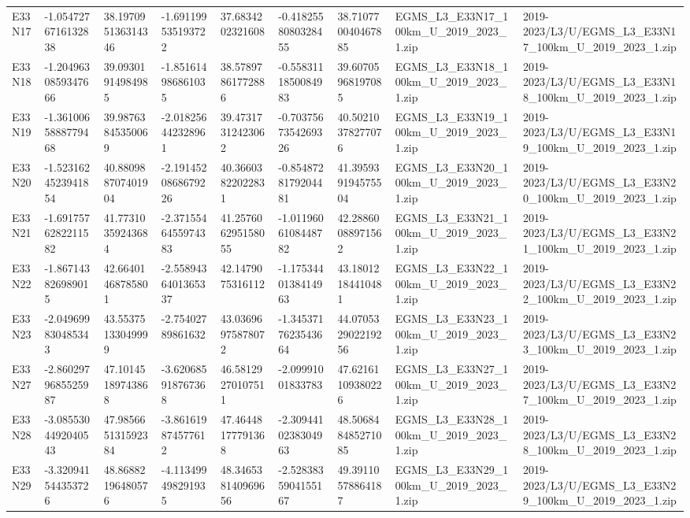 \begin{landscape}
\begin{longtable}{lllllllll}
E33N17 & -1.0547276716132838 & 38.197095136314346 & -1.691199535193722 & 37.6834202321608 & -0.4182558080328455 & 38.710770040467885 & EGMS\_L3\_E33N17\_100km\_U\_2019\_2023\_1.zip & 2019-2023/L3/U/EGMS\_L3\_E33N17\_100km\_U\_2019\_2023\_1.zip \\
E33N18 & -1.2049630859347666 & 39.09301914984985 & -1.851614986861035 & 38.57897861772886 & -0.5583111850084983 & 39.60705968197085 & EGMS\_L3\_E33N18\_100km\_U\_2019\_2023\_1.zip & 2019-2023/L3/U/EGMS\_L3\_E33N18\_100km\_U\_2019\_2023\_1.zip \\
E33N19 & -1.3610065888779468 & 39.98763845350069 & -2.018256442328961 & 39.47317312423062 & -0.7037567354269326 & 40.50210378277076 & EGMS\_L3\_E33N19\_100km\_U\_2019\_2023\_1.zip & 2019-2023/L3/U/EGMS\_L3\_E33N19\_100km\_U\_2019\_2023\_1.zip \\
E33N20 & -1.5231624523941854 & 40.880988707401904 & -2.1914520868679226 & 40.36603822022831 & -0.8548728179204481 & 41.395939194575504 & EGMS\_L3\_E33N20\_100km\_U\_2019\_2023\_1.zip & 2019-2023/L3/U/EGMS\_L3\_E33N20\_100km\_U\_2019\_2023\_1.zip \\
E33N21 & -1.6917576282211582 & 41.77310359243684 & -2.3715546455974383 & 41.257606295158055 & -1.0119606108448782 & 42.28860088971562 & EGMS\_L3\_E33N21\_100km\_U\_2019\_2023\_1.zip & 2019-2023/L3/U/EGMS\_L3\_E33N21\_100km\_U\_2019\_2023\_1.zip \\
E33N22 & -1.867143826989015 & 42.66401468785801 & -2.5589436401365337 & 42.1479075316112 & -1.1753440138414963 & 43.18012184410481 & EGMS\_L3\_E33N22\_100km\_U\_2019\_2023\_1.zip & 2019-2023/L3/U/EGMS\_L3\_E33N22\_100km\_U\_2019\_2023\_1.zip \\
E33N23 & -2.049699830485343 & 43.55375133049999 & -2.75402789861632 & 43.03696975878072 & -1.3453717623543664 & 44.070532902219256 & EGMS\_L3\_E33N23\_100km\_U\_2019\_2023\_1.zip & 2019-2023/L3/U/EGMS\_L3\_E33N23\_100km\_U\_2019\_2023\_1.zip \\
E33N27 & -2.8602979685525987 & 47.10145189743868 & -3.620685918767368 & 46.58129270107511 & -2.09991001833783 & 47.62161109380226 & EGMS\_L3\_E33N27\_100km\_U\_2019\_2023\_1.zip & 2019-2023/L3/U/EGMS\_L3\_E33N27\_100km\_U\_2019\_2023\_1.zip \\
E33N28 & -3.0855304492040543 & 47.985665131592384 & -3.861619874577612 & 47.46448177791368 & -2.3094410238304963 & 48.506848485271085 & EGMS\_L3\_E33N28\_100km\_U\_2019\_2023\_1.zip & 2019-2023/L3/U/EGMS\_L3\_E33N28\_100km\_U\_2019\_2023\_1.zip \\
E33N29 & -3.320941544353726 & 48.86882196480576 & -4.113499498291935 & 48.346538140969656 & -2.5283835904155167 & 49.39110578864187 & EGMS\_L3\_E33N29\_100km\_U\_2019\_2023\_1.zip & 2019-2023/L3/U/EGMS\_L3\_E33N29\_100km\_U\_2019\_2023\_1.zip \\

\end{longtable}
\end{landscape}
